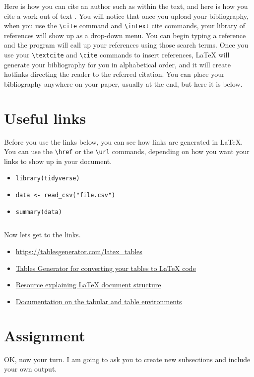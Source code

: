 \documentclass[10pt]{article}
\begin{document}
Here is how you can cite an author such as \textcite{bishin_when_2024} within the text, and here is how you cite a work out of text \cite{bishin_when_2024}. You will notice that once you upload your bibliography, when you use the \verb|\cite| command and \verb|\intext| cite commands, your library of references will show up as a drop-down menu. You can begin typing a reference and the program will call up your references using those search terms. Once you use your \verb|\textcite| and \verb|\cite| commands to insert references, \LaTeX{} will generate your bibliography for you in alphabetical order, and it will create hotlinks directing the reader to the referred citation. You can place your bibliography anywhere on your paper, usually at the end, but here it is below. 

\printbibliography


\section*{Useful links}
Before you use the links below, you can see how links are generated in \LaTeX{}. You can use the \verb|\href| or the \verb|\url| commands, depending on how you want your links to show up in your document.

\begin{itemize}
    \item \verb|library(tidyverse)|
    \item \verb|data <- read_csv("file.csv")|
    \item \verb|summary(data)|
\end{itemize}
\begin{verbatim}
\end{verbatim}

Now lets get to the links. 

\begin{itemize}
    \item \url{https://tablesgenerator.com/latex_tables}
    \item \href{https://tablesgenerator.com/latex_tables}{Tables Generator for converting your tables to \LaTeX{} code}
    \item \href{https://en.wikibooks.org/wiki/LaTeX/Document_Structure#}{Resource explaining \LaTeX{} document structure}
    \item \href{https://en.wikibooks.org/wiki/LaTeX/Tables}{Documentation on the tabular and table environments}
\end{itemize}

\section*{Assignment}
OK, now your turn. I am going to ask you to create new subsections and include your own output. 
\end{document}
